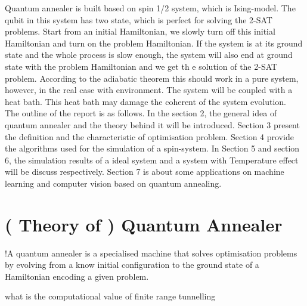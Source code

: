 \documentclass[twoside,a4paper,article]{combine}
\begin{document}
Quantum annealer is built based on spin 1/2 system, which is Ising-model. The qubit in this system has two state, which is perfect for solving the 2-SAT problems. Start from an initial Hamiltonian, we slowly turn off this initial Hamiltonian and turn on the problem Hamiltonian. If the system is at its ground state and the whole process is slow enough, the system will also end at ground state with the problem Hamiltonian and we get th e solution of the 2-SAT problem. According to the adiabatic theorem this should work in a pure system, however, in the real case with environment. The system will be coupled with a heat bath. This heat bath may damage the coherent of the system evolution. \\ 

The outline of the report is as follows. In the section 2, the general idea of quantum annealer and the theory behind it will be introduced. Section 3 present the definition and the characteristic of optimisation problem. Section 4 provide the algorithms used for the simulation of a spin-system. In Section 5 and section 6, the simulation results of a ideal system and a system with Temperature effect will be discuss respectively. Section 7 is about some applications on machine learning and computer vision based on quantum annealing.
\\


\newpage

\section{( Theory of ) Quantum Annealer}

!A quantum annealer is a specialised machine that solves optimisation problems by evolving from a know initial configuration to the ground state of a Hamiltonian encoding a given problem.


\cite{Das2008} 
\cite{Matsuda2009}
\cite{Santoro2006}
\cite{Denchev2015} what is the computational value of finite range tunnelling
\end{document}
